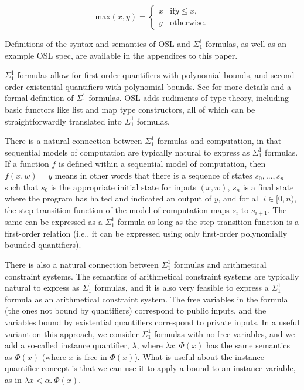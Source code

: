 \documentclass[11pt]{article}
\begin{document}
\begin{equation}
	\text{max}(x, y) = \begin{cases}
		x & \text{if} y \leq x, \\
		y & \text{otherwise}.
	\end{cases}
\end{equation}

Definitions of the syntax and semantics of OSL and $\Sigma^1_1$ formulas, as well as an example OSL spec, are available in the appendices to this paper.

$\Sigma^1_1$ formulas allow for first-order quantifiers with polynomial bounds, and second-order existential quantifiers with polynomial bounds. See \cite{sigma11-poly-bounds} for more details and a formal definition of $\Sigma^1_1$ formulas. OSL adds rudiments of type theory, including basic functors like list and map type constructors, all of which can be straightforwardly translated into $\Sigma^1_1$ formulas.

There is a natural connection between $\Sigma^1_1$ formulas and computation, in that sequential models of computation are typically natural to express as $\Sigma^1_1$ formulas. If a function $f$ is defined within a sequential model of computation, then $f(x, w) = y$ means in other words that there is a sequence of states $s_0, ..., s_n$ such that $s_0$ is the appropriate initial state for inputs $(x, w)$, $s_n$ is a final state where the program has halted and indicated an output of $y$, and for all $i \in [0, n)$, the step transition function of the model of computation maps $s_i$ to $s_{i+1}$. The same can be expressed as a $\Sigma^1_1$ formula as long as the step transition function is a first-order relation (i.e., it can be expressed using only first-order polynomially bounded quantifiers).

There is also a natural connection between $\Sigma^1_1$ formulas and arithmetical constraint systems. The semantics of arithmetical constraint systems are typically natural to express as $\Sigma^1_1$ formulas, and it is also very feasible to express a $\Sigma^1_1$ formula as an arithmetical constraint system. The free variables in the formula (the ones not bound by quantifiers) correspond to public inputs, and the variables bound by existential quantifiers correspond to private inputs. In a useful variant on this approach, we consider $\Sigma^1_1$ formulas with no free variables, and we add a so-called instance quantifier, $\lambda$, where $\lambda x.\ \Phi(x)$ has the same semantics as $\Phi(x)$ (where $x$ is free in $\Phi(x)$). What is useful about the instance quantifier concept is that we can use it to apply a bound to an instance variable, as in $\lambda x < \alpha.\ \Phi(x)$.
\end{document}
